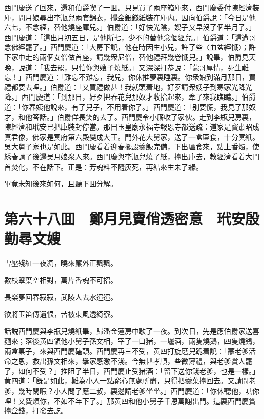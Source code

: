 西門慶送了回來，還和伯爵喫了一囬。只見買了兩座箱庫來，西門慶委付陳經濟裝庫，問月娘尋出李瓶兒兩套錦衣，攪金銀錢紙裝在庫内。因向伯爵說：「今日是他六七，不念經，替他燒座庫兒。」伯爵道：「好快光陰，嫂子又早沒了個半月了。」西門慶道：「這出月初五日，是他断七，少不的替他念個經兒。」伯爵道：「這遭哥念佛經罷了。」西門慶道：「大房下說，他在時因生小兒，許了些〈血盆經懺〉；許下家中走的兩個女僧做首座，請幾衆尼僧，替他禮拜幾卷懺兒。」說畢，伯爵見天晚，說道：「我去罷，只怕你與嫂子燒紙。」又深深打恭說：「蒙哥厚情，死生難忘！」西門慶道：「難忘不難忘，我兒，你休推夢裏睡裏。你衆娘到滿月那日，買禮都要去哩。」伯爵道：「又買禮做甚！我就頭着地，好歹請衆嫂子到寒家光降光降。」西門慶道：「到那日，好歹把春花兒那奴才收拾起來，牽了來我瞧瞧。」伯爵道：「你春姨他說來，有了兒子，不用着你了。」西門慶道：「别要慌，我見了那奴才，和他答話。」伯爵佯長笑的去了。西門慶令小廝收了家伙。走到李瓶兒房裏，陳經濟和玳安已把庫裝封停當。那日玉皇廟永福寺報恩寺都送疏：道家是寳肅昭成真君像，佛家是冥府第六殿變成大王。門外花大舅家，送了一盒匾食，十分冥紙。吳大舅子家也是如此。西門慶看着迎春擺設羹飯完備，下出匾食來，點上香燭，使綉春請了後邊吴月娘衆人來。西門慶與李瓶兒燒了紙，擡出庫去，教經濟看着大門首焚化，不在話下。正是：芳魂料不隨灰死，再結來生未了緣。

畢竟未知後來如何，且聽下囬分解。

\chapter*{第六十八囬　鄭月兒賣俏透密意　玳安殷勤尋文嫂}

雪壓殘紅一夜凋，曉來簾外正飄飄。

數枝翠葉空相對，萬片香魂不可招。

長楽夢回春寂寂，武陵人去水迢迢。

欲將玉笛傳遺恨，苦被東風透綺寮。

話説西門慶與李瓶兒燒紙畢，歸潘金蓮房中歇了一夜。到次日，先是應伯爵家送喜麵來；落後黄四領他小舅子孫文相，宰了一口猪，一壜酒，兩隻燒鵝，四隻燒鷄，兩盒菓子，來與西門慶磕頭。西門慶再三不受，黄四打旋磨兒跪着說：「蒙老爹活命之恩，救出孫文相來，擧家感激不淺。今無甚孝順，些微薄禮，與老爹賞人罷了，如何不受？」推阻了半日，西門慶止受猪酒：「留下送你錢老爹，也是一樣。」黄四道：「旣是如此，難為小人一點窮心無處所盡，只得把羹菓擡回去。又請問老爹，幾時閑暇？小人問了應二叔，裏邊請老爹坐坐。」西門慶道：「你休聽他，哄你哩！又費煩你，不如不年下了。」那黄四和他小舅子千恩萬謝出門。這裏西門慶賞擡盒錢，打發去訖。

